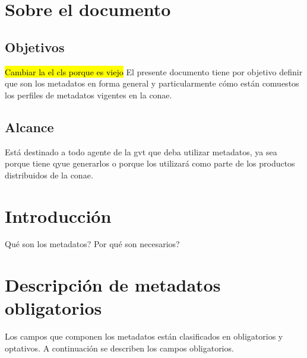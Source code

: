 \documentclass{GVT_CONAE_Class}
\begin{document}
\section{Sobre el documento}

    \subsection{Objetivos}
    
    \hl{Cambiar la el cls porque es viejo}
    El presente documento tiene por objetivo definir que son los metadatos en forma general y particularmente cómo están comuestos los perfiles de metadatos vigentes en la \gls{conae}.

    \subsection{Alcance}
    Está destinado a todo agente de la \gls{gvt} que deba utilizar metadatos, ya sea porque tiene qyue generarlos o porque los utilizará como parte de los productos distribuidos de la \gls{conae}.
    
    
    \printglossary[type=\acronymtype, numberedsection, title=Lista de acrónimos y abreviaturas]
\section{Introducción}
Qué son los metadatos? Por qué son necesarios? 

\section{Descripción de metadatos obligatorios}
Los campos que componen los metadatos están clasificados en obligatorios y optativos. A continuación se describen los campos obligatorios.
\end{document}
